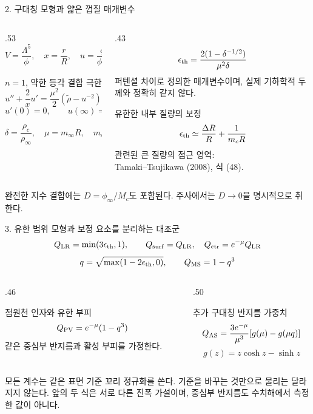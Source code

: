 \documentclass[10pt,aspectratio=169]{beamer}
\begin{document}
\begin{frame}{2. 구대칭 모형과 얇은 껍질 매개변수}
 \begin{columns}[T,onlytextwidth]
 \begin{column}{.53\textwidth}
  \[V=\frac{\Lambda^5}{\phi},\quad x=\frac rR,\quad u=\frac\phi{\phi_\infty}\]
  \begin{block}{$n=1$, 약한 등각 결합 극한}
   \[u''+\frac2x u'=\frac{\mu^2}{2}(\widetilde\rho-u^{-2})\]
   \[u'(0)=0,\qquad u(\infty)=1\]
  \end{block}
  \[\delta=\frac{\rho_c}{\rho_\infty},\quad \mu=m_\infty R,\quad m_cR=\mu\delta^{3/4}\]
 \end{column}
 \begin{column}{.43\textwidth}
  \[\epsilon_{\mathrm{th}}=\frac{2(1-\delta^{-1/2})}{\mu^2\delta}\]
  \small 퍼텐셜 차이로 정의한 매개변수이며, 실제 기하학적 두께와 정확히 같지 않다.
  \begin{block}{유한한 내부 질량의 보정}
   \[\epsilon_{\mathrm{th}}\simeq\frac{\Delta R}{R}+\frac1{m_cR}\]
   \scriptsize 관련된 큰 질량의 점근 영역:\\
   Tamaki--Tsujikawa (2008), 식 (48).
  \end{block}
 \end{column}
 \end{columns}
 \vfill\scriptsize\color{graytext}
 완전한 지수 결합에는 $D=\phi_\infty/M_c$도 포함된다. 주사에서는 $D\to0$을 명시적으로 취한다.
\end{frame}

\begin{frame}{3. 유한 범위 모형과 보정 요소를 분리하는 대조군}
 \small
 \[Q_{\mathrm{LR}}=\min(3\epsilon_{\mathrm{th}},1),\qquad Q_{\mathrm{surf}}=Q_{\mathrm{LR}},\quad Q_{\mathrm{ctr}}=e^{-\mu}Q_{\mathrm{LR}}\]
 \[q=\sqrt{\max(1-2\epsilon_{\mathrm{th}},0)},\qquad Q_{\mathrm{MS}}=1-q^3\]
 \begin{columns}[T,onlytextwidth]
 \begin{column}{.46\textwidth}
  \begin{block}{점원천 인자와 유한 부피}
   \[Q_{\mathrm{PV}}=e^{-\mu}(1-q^3)\]
   같은 중심부 반지름과 활성 부피를 가정한다.
  \end{block}
 \end{column}
 \begin{column}{.50\textwidth}
  \begin{block}{추가 구대칭 반지름 가중치}
   \[Q_{\mathrm{AS}}=\frac{3e^{-\mu}}{\mu^3}[g(\mu)-g(\mu q)]\]
   \[g(z)=z\cosh z-\sinh z\]
  \end{block}
 \end{column}
 \end{columns}
 \vfill\scriptsize
 모든 계수는 같은 표면 기준 꼬리 정규화를 쓴다. 기준을 바꾸는 것만으로 물리는 달라지지 않는다.
 앞의 두 식은 서로 다른 진폭 가설이며, 중심부 반지름도 수치해에서 측정한 값이 아니다.
\end{frame}
\end{document}
